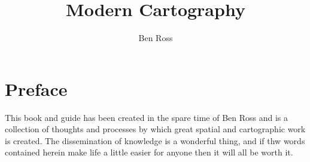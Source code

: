 \documentclass[12pt,a4paper]{memoir}
\title{Modern Cartography}
\author{Ben Ross} \label{author}
\begin{document}
\maketitle

\chapter*{Preface}
This book and guide has been created in the spare time of Ben Ross and is a collection of thoughts and processes by which great spatial and cartographic work is created. The dissemination of knowledge is a wonderful thing, and if thw words contained herein make life a little easier for anyone then it will all be worth it.

\tableofcontents* %


\end{document}
